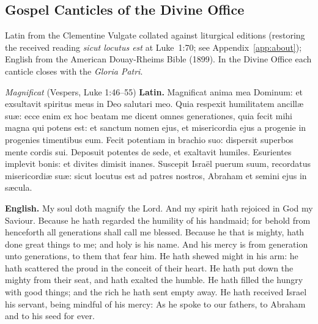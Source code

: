 \subsection{Gospel Canticles of the Divine Office}

Latin from the Clementine Vulgate collated against liturgical editions
(restoring the received reading \textit{sicut locutus est} at Luke~1:70; see
Appendix~\ref{app:about}); English from the American Douay-Rheims Bible (1899).
In the Divine Office each canticle closes with the \textit{Gloria Patri}.

\begin{massbox}{\textit{Magnificat} (Vespers, Luke 1:46--55)}
\textbf{Latin.} Magnificat anima mea Dominum: et exsultavit spiritus meus in Deo
salutari meo. Quia respexit humilitatem ancill\ae{} su\ae{}: ecce enim ex hoc
beatam me dicent omnes generationes, quia fecit mihi magna qui potens est: et
sanctum nomen ejus, et misericordia ejus a progenie in progenies timentibus
eum. Fecit potentiam in brachio suo: dispersit superbos mente cordis sui.
Deposuit potentes de sede, et exaltavit humiles. Esurientes implevit bonis: et
divites dimisit inanes. Suscepit Isra\"el puerum suum, recordatus
misericordi\ae{} su\ae{}: sicut locutus est ad patres nostros, Abraham et semini
ejus in s\ae cula.

\textbf{English.} My soul doth magnify the Lord. And my spirit hath rejoiced in
God my Saviour. Because he hath regarded the humility of his handmaid; for
behold from henceforth all generations shall call me blessed. Because he that is
mighty, hath done great things to me; and holy is his name. And his mercy is
from generation unto generations, to them that fear him. He hath shewed might in
his arm: he hath scattered the proud in the conceit of their heart. He hath put
down the mighty from their seat, and hath exalted the humble. He hath filled the
hungry with good things; and the rich he hath sent empty away. He hath received
Israel his servant, being mindful of his mercy: As he spoke to our fathers, to
Abraham and to his seed for ever.
\end{massbox}

